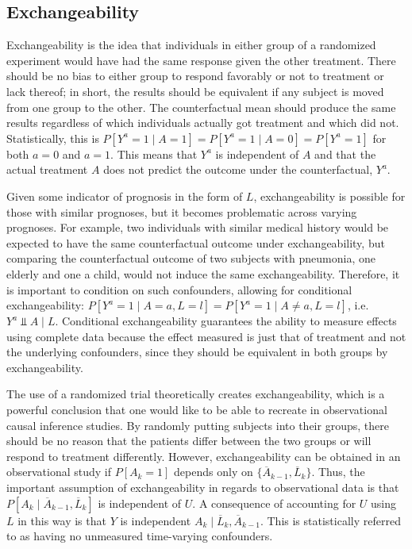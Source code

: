 \subsection{Exchangeability} \label{exchangeability} 
Exchangeability is the idea that individuals in either group of a randomized experiment would have had the same response given the other treatment. \cite{hernan_robins_2016}  There should be no bias to either group to respond favorably or not to treatment or lack thereof; in short, the results should be equivalent if any subject is moved from one group to the other.  The counterfactual mean should produce the same results regardless of which individuals actually got treatment and which did not.  Statistically, this is $P[Y^a = 1 \mid A = 1] = P[Y^a = 1 \mid A = 0] = P[Y^a = 1]$ for both $a=0$ and $a=1$.  This means that $Y^a$ is independent of $A$ and that the actual treatment $A$ does not predict the outcome under the counterfactual, $Y^a$.  


Given some indicator of prognosis in the form of $L$, exchangeability is possible for those with similar prognoses, but it becomes problematic across varying prognoses.  For example, two individuals with similar medical history would be expected to have the same counterfactual outcome under exchangeability, but comparing the counterfactual outcome of two subjects with pneumonia, one elderly and one a child, would not induce the same exchangeability.  Therefore, it is important to condition on such confounders, allowing for conditional exchangeability: $P[Y^a = 1 \mid A = a, L=l] = P[Y^a = 1 \mid A \neq a, L=l]$, i.e. $Y^{a} \Perp A\mid L$. \cite{hernan_robins_2016}  Conditional exchangeability guarantees the ability to measure effects using complete data because the effect measured is just that of treatment and not the underlying confounders, since they should be equivalent in both groups by exchangeability.  

The use of a randomized trial theoretically creates exchangeability, which is a powerful conclusion that one would like to be able to recreate in observational causal inference studies.   By randomly putting subjects into their groups, there should be no reason that the patients differ between the two groups or will respond to treatment differently.  However, exchangeability can be obtained in an observational study if $P[A_k = 1]$ depends only on $\{\overline{A}_{k-1}, \overline{L}_{k} \}$. Thus, the important assumption of exchangeability in regards to observational data is that  $ P[A_k \mid \overline{A}_{k-1}, \overline{L}_{k} ]$ is independent of $U$.   A consequence of accounting for $U$ using $L$ in this way is that $Y$ is independent $A_k \mid  \overline{L}_{k}, \overline{A}_{k-1}$.  This is statistically referred to as having no unmeasured time-varying confounders.  


